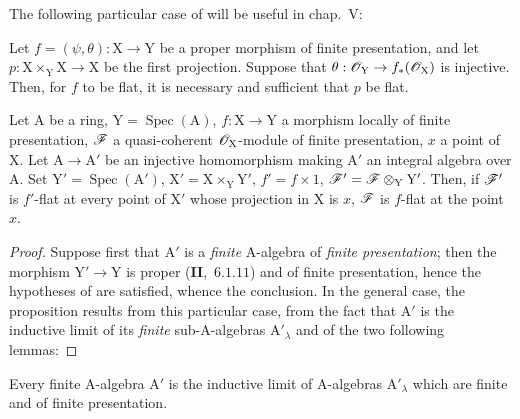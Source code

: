 The following particular case of  will be useful in chap.~V:

\begin{corollary}[11.5.4]
\label{IV.11.5.4}
Let $f=(\psi,\theta):\mathrm{X}\to\mathrm{Y}$ be a proper morphism of finite presentation,
and let $p:\mathrm{X}\times_\mathrm{Y}\mathrm{X}\to\mathrm{X}$ be the first projection. Suppose that $\theta:\mathscr{O}_\mathrm{Y}\to f_*(\mathscr{O}_\mathrm{X})$ is injective.
Then, for $f$ to be flat, it is necessary and sufficient that $p$ be flat.
\end{corollary}

\begin{proposition}[11.5.5]
\label{IV.11.5.5}
Let $\mathrm{A}$ be a ring, $\mathrm{Y}=\operatorname{Spec}(\mathrm{A})$, $f:\mathrm{X}\to\mathrm{Y}$ a morphism
locally of finite presentation, $\mathscr{F}$ a quasi-coherent $\mathscr{O}_\mathrm{X}$-module of finite presentation, $x$ a point
of $\mathrm{X}$. Let $\mathrm{A}\to\mathrm{A}'$ be an injective homomorphism making $\mathrm{A}'$ an integral algebra over $\mathrm{A}$. Set
$\mathrm{Y}'=\operatorname{Spec}(\mathrm{A}')$, $\mathrm{X}'=\mathrm{X}\times_\mathrm{Y}\mathrm{Y}'$, $f'=f\times 1$, $\mathscr{F}'=\mathscr{F}\otimes_\mathrm{Y}\mathrm{Y}'$. Then, if $\mathscr{F}'$ is $f'$-flat at every point
of $\mathrm{X}'$ whose projection in $\mathrm{X}$ is $x$, $\mathscr{F}$ is $f$-flat at the point $x$.
\end{proposition}

\begin{proof}
Suppose first that $\mathrm{A}'$ is a \emph{finite} $\mathrm{A}$-algebra of \emph{finite presentation}; then the
morphism $\mathrm{Y}'\to\mathrm{Y}$ is proper (\textbf{II},~$6.1.11$) and of finite presentation, hence the hypotheses
of  are satisfied, whence the conclusion. In the general case, the proposition results
from this particular case, from the fact that $\mathrm{A}'$ is the inductive limit of its \emph{finite} sub-$\mathrm{A}$-algebras
$\mathrm{A}'_\lambda$ and of the two following lemmas:
\end{proof}

\begin{lemma}[11.5.5.1]
\label{IV.11.5.5.1}
Every finite $\mathrm{A}$-algebra $\mathrm{A}'$ is the inductive limit of $\mathrm{A}$-algebras $\mathrm{A}'_\lambda$
which are finite and of finite presentation.
\end{lemma}

